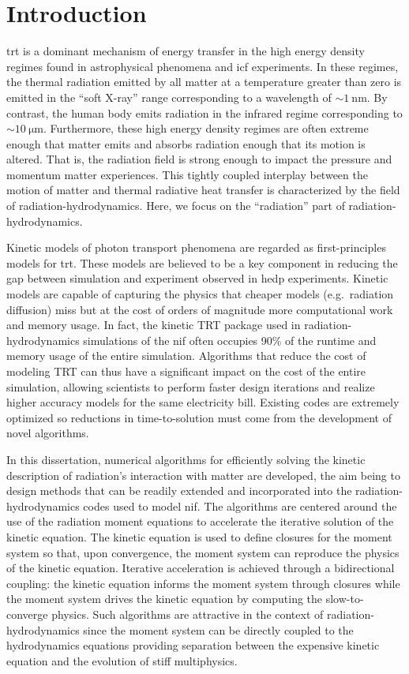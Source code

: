 \documentclass[../doc.tex]{subfiles}
\begin{document}
\chapter{Introduction}
\Gls{trt} is a dominant mechanism of energy transfer in the high energy density regimes found in astrophysical phenomena and \gls{icf} experiments. In these regimes, the thermal radiation emitted by all matter at a temperature greater than zero is emitted in the ``soft X-ray'' range corresponding to a wavelength of $\sim\!\SI{1}{\nano\meter}$. By contrast, the human body emits radiation in the infrared regime corresponding to $\sim\!\SI{10}{\micro\meter}$. 
Furthermore, these high energy density regimes are often extreme enough that matter emits and absorbs radiation enough that its motion is altered. 
That is, the radiation field is strong enough to impact the pressure and momentum matter experiences. This tightly coupled interplay between the motion of matter and thermal radiative heat transfer is characterized by the field of radiation-hydrodynamics. Here, we focus on the ``radiation'' part of radiation-hydrodynamics. 

Kinetic models of photon transport phenomena are regarded as first-principles models for \gls{trt}. These models are believed to be a key component in reducing the gap between simulation and experiment observed in \gls{hedp} experiments. 
Kinetic models are capable of capturing the physics that cheaper models (e.g.~radiation diffusion) miss but at the cost of orders of magnitude more computational work and memory usage. 
In fact, the kinetic TRT package used in radiation-hydrodynamics simulations of the \gls{nif} often occupies 90\% of the runtime and memory usage of the entire simulation. Algorithms that reduce the cost of modeling TRT can thus have a significant impact on the cost of the entire simulation, allowing scientists to perform faster design iterations and realize higher accuracy models for the same electricity bill. 
Existing codes are extremely optimized so reductions in time-to-solution must come from the development of novel algorithms. 

In this dissertation, numerical algorithms for efficiently solving the kinetic description of radiation's interaction with matter are developed, the aim being to design methods that can be readily extended and incorporated into the radiation-hydrodynamics codes used to model \gls{nif}. The algorithms are centered around the use of the radiation moment equations to accelerate the iterative solution of the kinetic equation. The kinetic equation is used to define closures for the moment system so that, upon convergence, the moment system can reproduce the physics of the kinetic equation. 
Iterative acceleration is achieved through a bidirectional coupling: the kinetic equation informs the moment system through closures while the moment system drives the kinetic equation by computing the slow-to-converge physics. Such algorithms are attractive in the context of radiation-hydrodynamics since the moment system can be directly coupled to the hydrodynamics equations providing separation between the expensive kinetic equation and the evolution of stiff multiphysics. 
\end{document}
